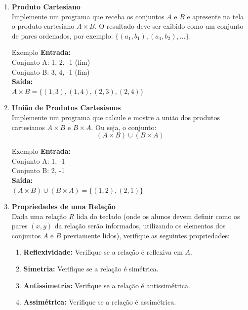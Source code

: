 \documentclass[12pt]{article}
\begin{document}
\vspace{0.4cm}
\begin{enumerate}

\item \textbf{Produto Cartesiano}\\
Implemente um programa que receba os conjuntos $A$ e $B$ e apresente na tela o produto cartesiano $A \times B$. O resultado deve ser exibido como um conjunto de pares ordenados, por exemplo: $\{(a_1, b_1), (a_1, b_2), \dots\}$.

\begin{block}{Exemplo}
\textbf{Entrada:} \\
Conjunto A: 1, 2, -1 (fim) \\
Conjunto B: 3, 4, -1 (fim) \\
\textbf{Saída:} \\
$A \times B = \{(1, 3), (1, 4), (2, 3), (2, 4)\}$
\end{block}

\vspace{0.3cm}
\item \textbf{União de Produtos Cartesianos}\\
Implemente um programa que calcule e mostre a união dos produtos cartesianos $A \times B$ e $B \times A$. Ou seja, o conjunto:
\[ (A \times B) \cup (B \times A) \]

\begin{block}{Exemplo}
\textbf{Entrada:} \\
Conjunto A: 1, -1 \\
Conjunto B: 2, -1 \\
\textbf{Saída:} \\
$(A \times B) \cup (B \times A) = \{(1, 2), (2, 1)\}$
\end{block}

\vspace{0.3cm}
\item \textbf{Propriedades de uma Relação}\\
Dada uma relação $R$ lida do teclado (onde os alunos devem definir como os pares $(x, y)$ da relação serão informados, utilizando os elementos dos conjuntos $A$ e $B$ previamente lidos), verifique as seguintes propriedades:
\begin{enumerate}[label=\alph*)]
    \item \textbf{Reflexividade:} Verifique se a relação é reflexiva em $A$.
    \item \textbf{Simetria:} Verifique se a relação é simétrica.
    \item \textbf{Antissimetria:} Verifique se a relação é antissimétrica.
    \item \textbf{Assimétrica:} Verifique se a relação é assimétrica.
\end{enumerate}


\end{enumerate}
\end{document}
